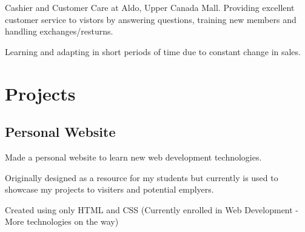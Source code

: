 \documentclass[]{dans-resume}
\begin{document}
\begin{minipage}[t]{0.66\textwidth}
\begin{tightemize}\item Cashier and Customer Care at Aldo, Upper Canada Mall.
  Providing excellent customer service to vistors by answering questions, training new members
  and handling exchanges/resturns.
  \item Learning and adapting in short periods of time due to constant change in sales.
\end{tightemize}


\section{Projects}

\subsection{Personal Website}
\vspace{\topsep}
\begin{tightemize}\item Made a personal website to learn new web development technologies.
\item Originally designed as a resource for my students but currently is used to  showcase
my projects to visiters and potential emplyers.
\item Created using only HTML and CSS (Currently enrolled in Web Development - More
technologies on the way)
\end{tightemize}
\sectionsep



\end{minipage}
\end{document}
